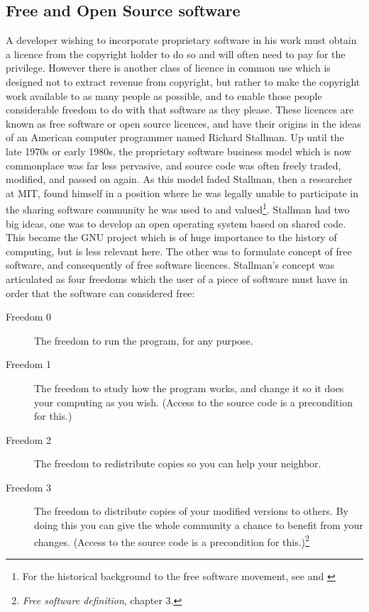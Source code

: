 \documentclass[a4paper,12pt]{article}
\begin{document}
\subsection{Free and Open Source software}

A developer wishing to incorporate proprietary software in his work must
obtain a licence from the copyright holder to do so and will often need to
pay for the privilege. However there is another class of licence in common
use which is designed not to extract revenue from copyright, but rather to
make the copyright work available to as many people as possible, and to
enable those people considerable freedom to do with that software as they
please. These licences are known as free software or open source licences,
and have their origins in the ideas of an American computer programmer named
Richard Stallman. Up until the late 1970s or early 1980s, the proprietary
software business model which is now commonplace was far less pervasive, and
source code was often freely traded, modified, and passed on again. As this
model faded Stallman, then a researcher at MIT, found himself in a position
where he was legally unable to participate in the sharing software community
he was used to and valued\footnote{For the historical background to the free
software movement, see \citet{Stallman2009} and \citet{Levy2001}}. Stallman
had two big ideas, one was to develop an open operating system based on
shared code. This became the GNU project which is of huge importance to the
history of computing, but is less relevant here. The other was to formulate
concept of free software, and consequently of free software
licences. Stallman's concept was articulated as four freedoms which the
user of a piece of software must have in order that the software can considered free:
\begin{description}
  \item[Freedom 0] The freedom to run the program, for any purpose.
  \item[Freedom 1] The freedom to study how the program works, and change it so it does your computing as you wish. (Access to the source code is a precondition for this.)
  \item[Freedom 2] The freedom to redistribute copies so you can help your neighbor.
  \item[Freedom 3] The freedom to distribute copies of your modified
    versions to others. By doing this you can give the whole community a
    chance to benefit from your changes. (Access to the source code is a
    precondition for this.)\footnote{\textit{Free software definition},
      \citet{Stallman2009} chapter 3.}
\end{description}
\end{document}
